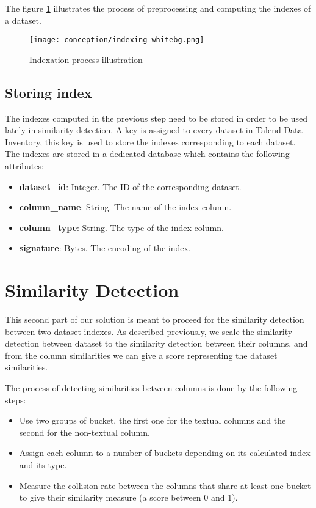 The figure \ref{fig:indexation_process} illustrates the process of preprocessing
and computing the indexes of a dataset.

\begin{figure}[h]
    \centering
    \texttt{[image: conception/indexing-whitebg.png]}
    \caption{Indexation process illustration}
    \label{fig:indexation_process}
\end{figure}

\subsection{Storing index}
The indexes computed in the previous step need to be stored in order to be used
lately in similarity detection. A key is assigned to every dataset in Talend
Data Inventory, this key is used to store the indexes corresponding to each
dataset. The indexes are stored in a dedicated database which contains the
following attributes:

\begin{itemize}
    \item \textbf{dataset\_id}: Integer. The ID of the corresponding dataset.
    \item \textbf{column\_name}: String. The name of the index column.
    \item \textbf{column\_type}: String. The type of the index column.
    \item \textbf{signature}: Bytes. The encoding of the index.
\end{itemize}


\section{Similarity Detection}
This second part of our solution is meant to proceed for the similarity
detection between two dataset indexes. As described previously, we scale the
similarity detection between dataset to the similarity detection between their
columns, and from the column similarities we can give a score representing the
dataset similarities. 

The process of detecting similarities between columns is
done by the following steps:

\begin{itemize}
    \item Use two groups of bucket, the first one for the textual columns and
    the second for the non-textual column.
    \item Assign each column to a number of buckets depending on its
     calculated index and its type.
    \item Measure the collision rate between the columns that share at least one
    bucket to give their similarity measure (a score between 0 and 1).
\end{itemize}


